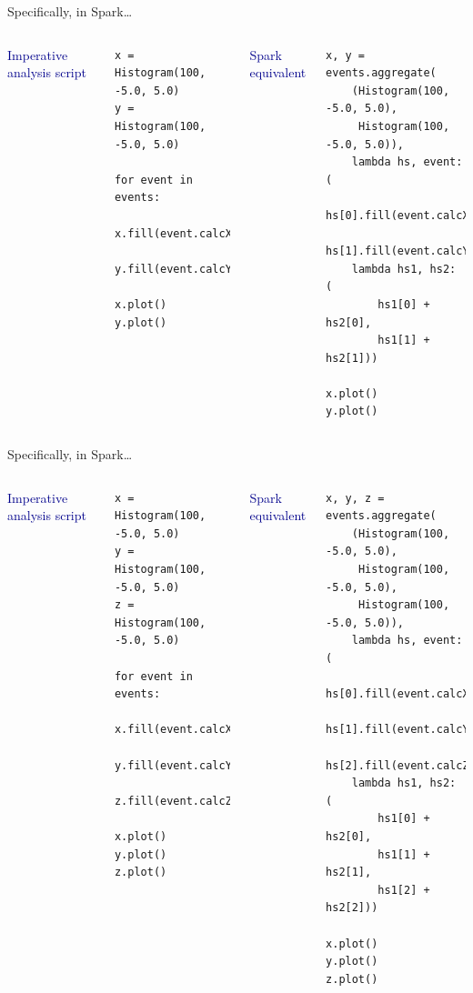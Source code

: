\documentclass[aspectratio=169]{beamer}
\begin{document}
\begin{frame}[fragile]{Specifically, in Spark\ldots}
\vspace{0.5 cm}
\begin{columns}

\textcolor{darkblue}{Imperative analysis script}
\small
\begin{verbatim}
x = Histogram(100, -5.0, 5.0)
y = Histogram(100, -5.0, 5.0)

for event in events:
    x.fill(event.calcX())
    y.fill(event.calcY())

x.plot()
y.plot()
\end{verbatim}

\textcolor{darkblue}{Spark equivalent}
\small
\begin{verbatim}
x, y = events.aggregate(
    (Histogram(100, -5.0, 5.0),
     Histogram(100, -5.0, 5.0)),
    lambda hs, event: (
        hs[0].fill(event.calcX()),
        hs[1].fill(event.calcY())),
    lambda hs1, hs2: (
        hs1[0] + hs2[0],
        hs1[1] + hs2[1]))

x.plot()
y.plot()
\end{verbatim}
\end{columns}
\end{frame}

\begin{frame}[fragile]{Specifically, in Spark\ldots}
\vspace{0.5 cm}
\begin{columns}

\textcolor{darkblue}{Imperative analysis script}
\small
\begin{verbatim}
x = Histogram(100, -5.0, 5.0)
y = Histogram(100, -5.0, 5.0)
z = Histogram(100, -5.0, 5.0)

for event in events:
    x.fill(event.calcX())
    y.fill(event.calcY())
    z.fill(event.calcZ())

x.plot()
y.plot()
z.plot()
\end{verbatim}

\textcolor{darkblue}{Spark equivalent}
\small
\begin{verbatim}
x, y, z = events.aggregate(
    (Histogram(100, -5.0, 5.0),
     Histogram(100, -5.0, 5.0),
     Histogram(100, -5.0, 5.0)),
    lambda hs, event: (
        hs[0].fill(event.calcX()),
        hs[1].fill(event.calcY()),
        hs[2].fill(event.calcZ())),
    lambda hs1, hs2: (
        hs1[0] + hs2[0],
        hs1[1] + hs2[1],
        hs1[2] + hs2[2]))

x.plot()
y.plot()
z.plot()
\end{verbatim}
\end{columns}
\end{frame}
\end{document}
